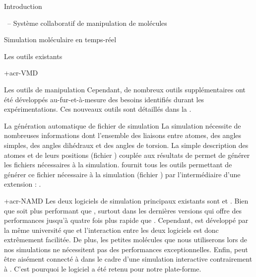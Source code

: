 \documentclass[myfrancais]{mythesis}
\begin{document}
\begin{mypart}{Introduction}
\begin{mychapter}{\myShaddock\ -- Système collaboratif de manipulation de molécules}
\begin{mysection}{Simulation moléculaire en temps-réel}
\begin{mysubsection}{Les outils existants}
\begin{mysubsubsection}{\myacronl+{acr-VMD}}
\begin{myparagraph}{Les outils de manipulation}
							Cependant, de nombreux outils supplémentaires ont été développés au-fur-et-à-mesure des besoins identifiés durant les expérimentations.
							Ces nouveaux outils sont détaillés dans la .
						\end{myparagraph}
						\begin{myparagraph}{La génération automatique de fichier de simulation}
							La simulation nécessite de nombreuses informations dont l'ensemble des liaisons entre atomes, des angles simples, des angles dihédraux et des angles de torsion.
							La simple description des atomes et de leurs positions (fichier \myPDB) couplée aux résultats de \myCHARMM {} permet de générer les fichiers nécessaires à la simulation.
							 fournit tous les outils permettant de générer ce fichier nécessaire à la simulation (fichier \myPSF) par l'intermédiaire d'une extension : .
						\end{myparagraph}
					\end{mysubsubsection}
					\begin{mysubsubsection}{\myacronl+{acr-NAMD}}
						Les deux logiciels de simulation principaux existants sont   et \myGromacs {}.
						Bien que \myGromacs soit plus performant que , surtout dans les dernières versions  qui offre des performances jusqu'à quatre fois plus rapide que .
						Cependant,  est développé par la même université que  et l'interaction entre les deux logiciels est donc extrêmement facilitée.
						De plus, les petites molécules que nous utiliserons lors de nos simulations ne nécessitent pas des performances exceptionnelles.
						Enfin,  peut être aisément connecté à  dans le cadre d'une simulation interactive  contrairement à \myGromacs.
						C'est pourquoi le logiciel  a été retenu pour notre plate-forme.


\end{mysubsubsection}
\end{mysubsection}
\end{mysection}
\end{mychapter}
\end{mypart}
\end{document}
